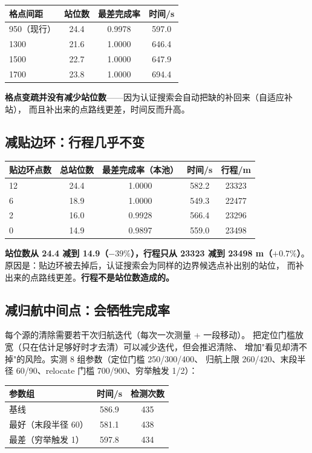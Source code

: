 \begin{center}
\begin{tabular}{lccc}
\toprule
格点间距 & 站位数 & 最差完成率 & 时间/s \\ \midrule
950（现行） & 24.4 & 0.9978 & 597.0 \\
1300 & 21.6 & 1.0000 & 646.4 \\
1500 & 22.7 & 1.0000 & 647.9 \\
1700 & 23.8 & 1.0000 & 694.4 \\
\bottomrule
\end{tabular}
\end{center}

\textbf{格点变疏并没有减少站位数}——因为认证搜索会自动把缺的补回来（自适应补站），
而且补出来的点路线更差，时间反而升高。

\subsection{减贴边环：行程几乎不变}

\begin{center}
\begin{tabular}{lcccc}
\toprule
贴边环点数 & 总站位数 & 最差完成率（本池） & 时间/s & 行程/m \\ \midrule
12 & 24.4 & 1.0000 & 582.2 & 23323 \\
6 & 18.9 & 1.0000 & 549.3 & 22477 \\
2 & 16.0 & 0.9928 & 566.4 & 23296 \\
0 & 14.9 & 0.9897 & 559.0 & 23498 \\
\bottomrule
\end{tabular}
\end{center}

\textbf{站位数从 24.4 减到 14.9（$-39\%$），行程只从 23323 减到 23498 m（$+0.7\%$）}。
原因是：贴边环被去掉后，认证搜索会为同样的边界候选点补出别的站位，
而补出来的点路线更差。\textbf{行程不是站位数造成的。}

\subsection{减归航中间点：会牺牲完成率}

每个源的清除需要若干次归航迭代（每次一次测量 + 一段移动）。
把定位门槛放宽（只在估计足够好时才去清）可以减少迭代，但会推迟清除、
增加"看见却清不掉"的风险。实测 8 组参数（定位门槛 250/300/400、
归航上限 260/420、末段半径 60/90、relocate 门槛 700/900、穷举触发 1/2）：

\begin{center}
\begin{tabular}{lcc}
\toprule
参数组 & 时间/s & 检测次数 \\ \midrule
基线 & 586.9 & 435 \\
最好（末段半径 60） & 581.1 & 438 \\
最差（穷举触发 1） & 597.8 & 434 \\
\bottomrule
\end{tabular}
\end{center}

